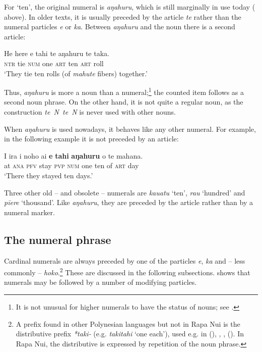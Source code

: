 For ‘ten’, the original numeral is \textit{{\ꞌ}aŋahuru}, which is still marginally in use today ( above). In older texts, it is usually preceded by the article \textit{te} rather than the numeral particles \textit{e} or \textit{ka}. Between \textit{{\ꞌ}aŋahuru} and the noun there is a second article:

\ea\label{ex:4.23}
\gll He here e tahi te {\ꞌ}aŋahuru te taka.\\
\textsc{ntr} tie \textsc{num} one \textsc{art} ten \textsc{art} roll\\

\glt
‘They tie ten rolls (of \textit{mahute} fibers) together.’ \textstyleExampleref{[Ley-5-05.002]}
\z

Thus, \textit{{\ꞌ}aŋahuru} is more a noun than a numeral;\footnote{\label{fn:173}It is not unusual for higher numerals to have the status of nouns; see \citet[78]{Dixon2012}.} the counted item follows as a second noun phrase. On the other hand, it is not quite a regular noun, as the construction \textit{te~N~te~N} is never used with other nouns.

When \textit{{\ꞌ}aŋahuru} is used nowadays, it behaves like any other numeral. For example, in the following example it is not preceded by an article:

\ea\label{ex:4.24}
\gll {\ꞌ}I ira i noho ai \textbf{e} \textbf{tahi} \textbf{{\ꞌ}aŋahuru} o te mahana. \\
at \textsc{ana} \textsc{pfv} stay \textsc{pvp} \textsc{num} one ten of \textsc{art} day \\

\glt
‘There they stayed ten days.’ \textstyleExampleref{[R420.047]} 
\z

Three other old – and obsolete – numerals are \textit{kauatu} ‘ten’, \textit{rau} ‘hundred’ and \textit{pīere} ‘thousand’. Like \textit{{\ꞌ}aŋahuru}, they are preceded by the article rather than by a numeral marker.

\subsection{The numeral phrase}\label{sec:4.3.2}

Cardinal numerals are always preceded by one of the particles \textit{e}, \textit{ka} and – less commonly – \textit{hoko}.\footnote{\label{fn:174}A prefix found in other Polynesian languages but not in Rapa Nui is the distributive prefix \textit{*taki-} (e.g. \textit{takitahi} ‘one each’), used e.g. in  (\citealt[182]{LazardPeltzer2000}),  \citep[492]{Stimson1964},  \citep[498]{Bauer1993},  (\citealt[116]{MoselHovdhaugen1992}). In Rapa Nui, the distributive is expressed by repetition of the noun phrase.} These are discussed in the following subsections.  shows that numerals may be followed by a number of modifying particles.

